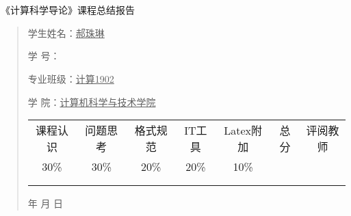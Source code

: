 \documentclass{article}
\renewcommand{\today}{\number\year 年 \number\month 月 \number\day 日}
\begin{document}
\begin{figure}
    \centering
    

    \label{figupc}
\end{figure}

	\begin{center}
		\quad \\
		\quad \\
		\heiti \fontsize{45}{17} \quad \quad \quad 
		\vskip 1.5cm
		\heiti {} 《计算科学导论》课程总结报告
	\end{center}
	\vskip 2.0cm
		
	\begin{quotation}
		\doublespacing
		
        \par\setlength\parindent{7em}
		\quad 

		学生姓名：\underline{\qquad  郝珠琳 \qquad \qquad}

		学\hspace{0.61cm} 号：\underline{\qquad}
		
		专业班级：\underline{\qquad 计算1902\qquad  }
		
        学\hspace{0.61cm} 院：\underline{计算机科学与技术学院}
		\vskip 2cm
		\centering
		\begin{table}[h]
            \centering 
            \begin{tabular}{|c|c|c|c|c|c|c|}
                \hline
                课程认识 & 问题思 考 & 格式规范  & IT工具  & Latex附加  & 总分 & 评阅教师 \\
                30\% & 30\% & 20\% & 20\% & 10\% &  &  \\
                \hline
                 & & & & & &\\
                & & & & & &\\
                \hline
            \end{tabular}
        \end{table}
		\vskip 2cm
		\today
	\end{quotation}

\thispagestyle{empty}
\newpage
\setcounter{page}{1}
\end{document}
